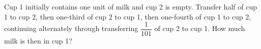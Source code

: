 Cup 1 initially contains one unit of milk and cup 2 is empty. Transfer half of cup 1 to cup 2, then one-third of cup 2 to cup 1, then one-fourth of cup 1 to cup 2, continuing alternately through transferring $\dfrac{1}{101}$ of cup 2 to cup 1. How much milk is then in cup 1?
